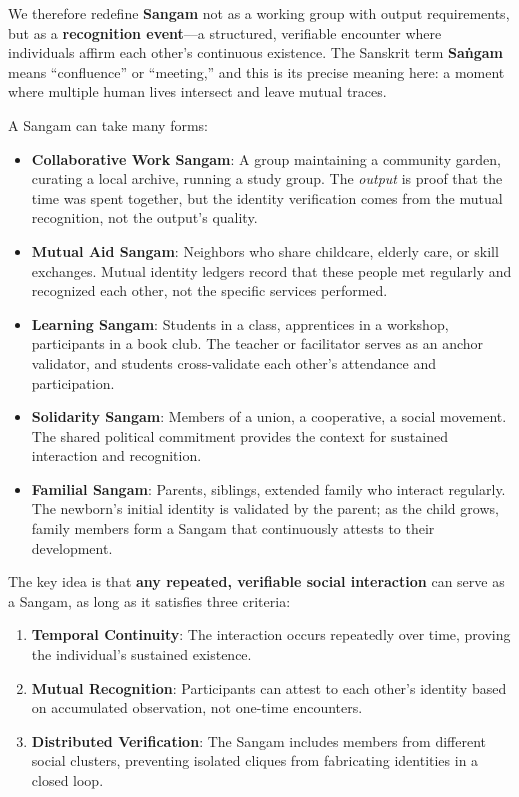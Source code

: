We therefore redefine \textbf{Sangam} not as a working group with output
requirements, but as a \textbf{recognition event}---a structured,
verifiable encounter where individuals affirm each other's continuous
existence. The Sanskrit term \textbf{Saṅgam} means ``confluence'' or
``meeting,'' and this is its precise meaning here: a moment where
multiple human lives intersect and leave mutual traces.

A Sangam can take many forms:

\begin{itemize}
\item
  \textbf{Collaborative Work Sangam}: A group maintaining a community
  garden, curating a local archive, running a study group. The
  \emph{output} is proof that the time was spent together, but the
  identity verification comes from the mutual recognition, not the
  output's quality.
\item
  \textbf{Mutual Aid Sangam}: Neighbors who share childcare, elderly
  care, or skill exchanges. Mutual identity ledgers record that these
  people met regularly and recognized each other, not the specific
  services performed.
\item
  \textbf{Learning Sangam}: Students in a class, apprentices in a
  workshop, participants in a book club. The teacher or facilitator
  serves as an anchor validator, and students cross-validate each
  other's attendance and participation.
\item
  \textbf{Solidarity Sangam}: Members of a union, a cooperative, a
  social movement. The shared political commitment provides the context
  for sustained interaction and recognition.
\item
  \textbf{Familial Sangam}: Parents, siblings, extended family who
  interact regularly. The newborn's initial identity is validated by the
  parent; as the child grows, family members form a Sangam that
  continuously attests to their development.
\end{itemize}

The key idea is that \textbf{any repeated, verifiable social
interaction} can serve as a Sangam, as long as it satisfies three
criteria:

\begin{enumerate}
\def\labelenumi{\arabic{enumi}.}
\tightlist
\item
  \textbf{Temporal Continuity}: The interaction occurs repeatedly over
  time, proving the individual's sustained existence.
\item
  \textbf{Mutual Recognition}: Participants can attest to each other's
  identity based on accumulated observation, not one-time encounters.
\item
  \textbf{Distributed Verification}: The Sangam includes members from
  different social clusters, preventing isolated cliques from
  fabricating identities in a closed loop.
\end{enumerate}

